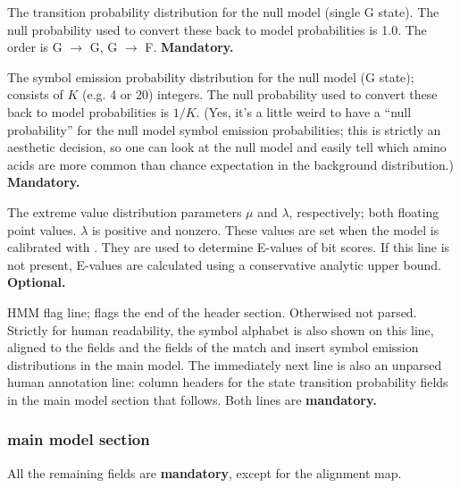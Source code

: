 \begin{wideitem}
\item [\emprog{NULT  <d> <d>}] The transition probability distribution
for the null model (single G state). The null probability used to
convert these back to model probabilities is 1.0. The order is G
$\rightarrow$ G, G $\rightarrow$ F.
\textbf{Mandatory.}

\item [\emprog{NULE  <d>*K}] The symbol emission probability
distribution for the null model (G state); consists of $K$ (e.g. 4 or
20) integers. The null probability used to convert these back to model
probabilities is $1/K$. (Yes, it's a little weird to have a ``null
probability'' for the null model symbol emission probabilities; this
is strictly an aesthetic decision, so one can look at the null model
and easily tell which amino acids are more common than chance
expectation in the background distribution.) 
\textbf{Mandatory.}

\item [\emprog{EVD   <f> <f>}] The extreme value distribution
parameters $\mu$ and $\lambda$, respectively; both floating point
values. $\lambda$ is positive and nonzero. These values are set when
the model is calibrated with . They are used to
determine E-values of bit scores. If this line is not present,
E-values are calculated using a conservative analytic upper bound.
\textbf{Optional.}

\item [\emprog{HMM    }] HMM flag line; flags the end of the header
section. Otherwised not parsed. Strictly for human readability, the
symbol alphabet is also shown on this line, aligned to the 
fields and the fields of the match and insert symbol emission
distributions in the main model. The immediately next line is also an
unparsed human annotation line: column headers for the state
transition probability fields in the main model section that follows.
Both lines are \textbf{mandatory.}

\end{wideitem}

\subsubsection{main model section}

All the remaining fields are \textbf{mandatory}, except for the
alignment map.

